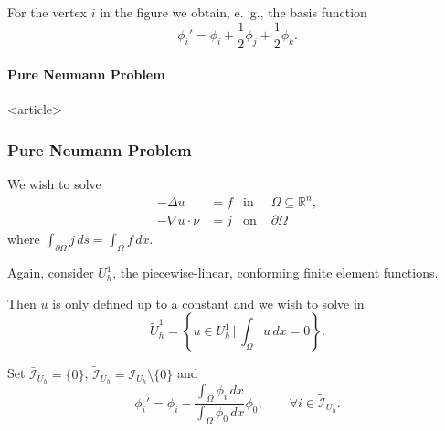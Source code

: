 \begin{frame}
For the vertex $i$ in the figure we obtain, e.~g., the basis function
\begin{equation*}
\phi_i' = \phi_i + \frac12 \phi_j + \frac12 \phi_k .
\end{equation*}
\end{frame}


\paragraph{Pure Neumann Problem}

\begin{frame}<article>
\frametitle<presentation>{Pure Neumann Problem}
We wish to solve
\begin{align*}
                -\Delta u &= f& \text{in }& \Omega\subseteq\mathbb{R}^n,\\
     - \nabla u\cdot\nu   &= j& \text{on }& \partial\Omega
\end{align*}
where $\int_{\partial\Omega} j \, ds = \int_\Omega f \, dx$.

Again, consider $U_h^1$, the piecewise-linear, conforming finite
element functions.

Then $u$ is only defined up to a constant and we wish to solve in
\begin{equation*}
\tilde{U}^1_h = \left\{u \in U^1_h \,\Biggl |\, \int_\Omega u \, dx = 0\right\}.
\end{equation*}

Set $\bar{\mathcal{I}}_{U_h}=\{0\}$, $\tilde{\mathcal{I}}_{U_h}
= \mathcal{I}_{U_h}\setminus\{0\}$ and
\begin{equation*}
\phi_i' = \phi_i - \frac{\int_\Omega\phi_i\, dx}{\int_\Omega\phi_0\,
dx} \phi_0, \qquad \forall i\in\tilde{\mathcal{I}}_{U_h}.
\end{equation*}
\end{frame}

